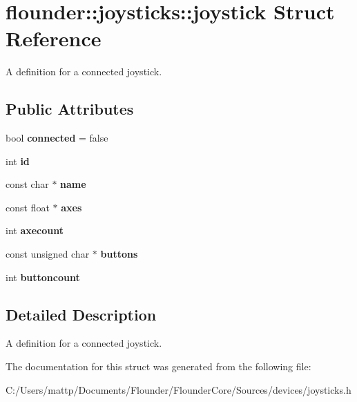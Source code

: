 \hypertarget{structflounder_1_1joysticks_1_1joystick}{}\section{flounder\+:\+:joysticks\+:\+:joystick Struct Reference}
\label{structflounder_1_1joysticks_1_1joystick}


A definition for a connected joystick.  


\subsection*{Public Attributes}
\begin{DoxyCompactItemize}
\item 
\mbox{\label{structflounder_1_1joysticks_1_1joystick_aab4c67ee2724a9826754662ca864f8e2}} 
bool {\bfseries connected} = false
\item 
\mbox{\label{structflounder_1_1joysticks_1_1joystick_adac353f8690ff9778414b7acffbc9c30}} 
int {\bfseries id}
\item 
\mbox{\label{structflounder_1_1joysticks_1_1joystick_abb67b19fa449da0f7c85390dd81e4f6b}} 
const char $\ast$ {\bfseries name}
\item 
\mbox{\label{structflounder_1_1joysticks_1_1joystick_ae0ba6372eb1dbea65f7ba48f9da3ae62}} 
const float $\ast$ {\bfseries axes}
\item 
\mbox{\label{structflounder_1_1joysticks_1_1joystick_a27ad5b99b97a042503e747469c3e1edc}} 
int {\bfseries axecount}
\item 
\mbox{\label{structflounder_1_1joysticks_1_1joystick_ac22932511f47b7f2bd76c8e33607003c}} 
const unsigned char $\ast$ {\bfseries buttons}
\item 
\mbox{\label{structflounder_1_1joysticks_1_1joystick_a0c2236894e920fb527f84636205e7675}} 
int {\bfseries buttoncount}
\end{DoxyCompactItemize}


\subsection{Detailed Description}
A definition for a connected joystick. 



The documentation for this struct was generated from the following file\+:\begin{DoxyCompactItemize}
\item 
C\+:/\+Users/mattp/\+Documents/\+Flounder/\+Flounder\+Core/\+Sources/devices/joysticks.\+h\end{DoxyCompactItemize}
